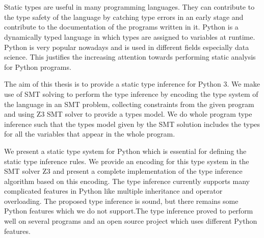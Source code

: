 \chapter{\abstractname}

Static types are useful in many programming languages. They can contribute to the type safety of the language by catching type errors in an early stage and contribute to the documentation of the programs written in it. Python is a dynamically typed language in which types are assigned to variables at runtime. Python is very popular nowadays and is used in different fields especially data science. This justifies the increasing attention towards performing static analysis for Python programs.

The aim of this thesis is to provide a static type inference for Python 3. We make use of SMT solving to perform the type inference by encoding the type system of the language in an SMT problem, collecting constraints from the given program and using Z3 SMT solver to provide a types model. We do whole program type inference such that the types model given by the SMT solution includes the types for all the variables that appear in the whole program.

We present a static type system for Python which is essential for defining the static type inference rules. We provide an encoding for this type system in the SMT solver Z3 and present a complete implementation of the type inference algorithm based on this encoding. The type inference currently supports many complicated features in Python like multiple inheritance and operator overloading. The proposed type inference is sound, but there remains some Python features which we do not support.The type inference proved to perform well on several programs and an open source project which uses different Python features.